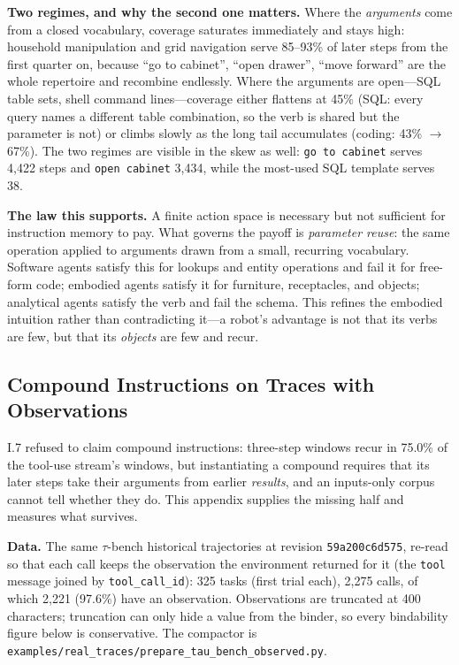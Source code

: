 \documentclass[
  11pt,
]{article}
\begin{document}
\textbf{Two regimes, and why the second one matters.} Where the
\emph{arguments} come from a closed vocabulary, coverage saturates
immediately and stays high: household manipulation and grid navigation
serve 85--93\% of later steps from the first quarter on, because ``go to
cabinet'', ``open drawer'', ``move forward'' are the whole repertoire
and recombine endlessly. Where the arguments are open---SQL table sets,
shell command lines---coverage either flattens at 45\% (SQL: every query
names a different table combination, so the verb is shared but the
parameter is not) or climbs slowly as the long tail accumulates (coding:
43\% \(\rightarrow\) 67\%). The two regimes are visible in the skew as
well: \texttt{go\ to\ cabinet} serves 4,422 steps and
\texttt{open\ cabinet} 3,434, while the most-used SQL template serves
38.

\textbf{The law this supports.} A finite action space is necessary but
not sufficient for instruction memory to pay. What governs the payoff is
\emph{parameter reuse}: the same operation applied to arguments drawn
from a small, recurring vocabulary. Software agents satisfy this for
lookups and entity operations and fail it for free-form code; embodied
agents satisfy it for furniture, receptacles, and objects; analytical
agents satisfy the verb and fail the schema. This refines the embodied
intuition rather than contradicting it---a robot's advantage is not that
its verbs are few, but that its \emph{objects} are few and recur.

\subsection{Compound Instructions on Traces with
Observations}\label{compound-instructions-on-traces-with-observations}

I.7 refused to claim compound instructions: three-step windows recur in
75.0\% of the tool-use stream's windows, but instantiating a compound
requires that its later steps take their arguments from earlier
\emph{results}, and an inputs-only corpus cannot tell whether they do.
This appendix supplies the missing half and measures what survives.

\textbf{Data.} The same \(\tau\)-bench historical trajectories at
revision \texttt{59a200c6d575}, re-read so that each call keeps the
observation the environment returned for it (the \texttt{tool} message
joined by \texttt{tool\_call\_id}): 325 tasks (first trial each), 2,275
calls, of which 2,221 (97.6\%) have an observation. Observations are
truncated at 400 characters; truncation can only hide a value from the
binder, so every bindability figure below is conservative. The compactor
is \texttt{examples/real\_traces/prepare\_tau\_bench\_observed.py}.
\end{document}
